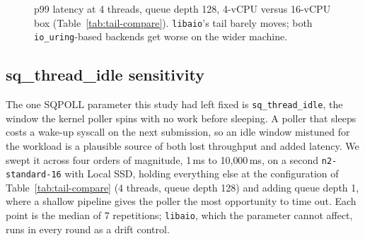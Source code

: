 \documentclass[conference]{IEEEtran}
\begin{document}
\begin{figure}[t]
\centering
{}
\caption{p99 latency at 4 threads, queue depth 128, 4-vCPU versus 16-vCPU box
(Table~\ref{tab:tail-compare}). \texttt{libaio}'s tail barely moves; both \texttt{io\_uring}-based
backends get worse on the wider machine.}
\label{fig:tail-compare}
\end{figure}

\subsection{sq\_thread\_idle sensitivity}

The one SQPOLL parameter this study had left fixed is \texttt{sq\_thread\_idle}, the window the
kernel poller spins with no work before sleeping. A poller that sleeps costs a wake-up syscall on
the next submission, so an idle window mistuned for the workload is a plausible source of both
lost throughput and added latency. We swept it across four orders of magnitude, 1\,ms to
10{,}000\,ms, on a second \texttt{n2-standard-16} with Local SSD, holding everything else at the
configuration of Table~\ref{tab:tail-compare} (4 threads, queue depth 128) and adding queue depth
1, where a shallow pipeline gives the poller the most opportunity to time out. Each point is the
median of 7 repetitions; \texttt{libaio}, which the parameter cannot affect, runs in every round
as a drift control.
\end{document}
